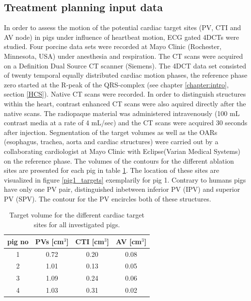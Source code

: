 \subsection{Treatment planning input data}
In order to assess the motion of the potential cardiac target sites (PV, CTI and AV node) in pigs under influence of heartbeat motion, 
ECG gated 4DCTs were studied. Four porcine data sets were recorded at Mayo Clinic (Rochester, Minnesota, USA) under anesthesia and respiration.  
The CT scans were acquired on a Definition Dual Source CT scanner (Siemens). The 4DCT data set consisted of twenty temporal equally distributed 
cardiac motion phases, the reference phase zero started at the R-peak of the QRS-complex (see chapter \ref{chapter:intro}, section \ref{HCS}). 
Native CT scans were recorded. In order to distinguish structures within the heart, contrast enhanced CT scans were also aquired directly 
after the native scans. The radiopaque material was administered intravenously (100 mL contrast media at a rate of 4 mL/sec) and the CT scans 
were acquired 30 seconds after injection.
Segmentation of the target volumes as well as the OARs (esophagus, trachea, aorta and cardiac structures) were carried out by a collaborating 
cardiologist at Mayo Clinic with Eclipse\texttrademark (Varian Medical Systems) on the reference phase. The volumes of the contours for the 
different ablation sites are presented for each pig in table \ref{tab:volume:mayo:porcine}. The location of these sites are visualized in 
figure \ref{pig1_targets} exemplarily for pig 1. Contrary to humans pigs have only one PV pair, distinguished inbetween inferior PV (IPV) and 
superior PV (SPV). The contour for the PV encircles both of these structures. 


\begin{table}[htbp]
  \centering
  \caption{Target volume for the different cardiac target sites for all investigated pigs.}
  \begin{tabular}{|c|c|c|c|}
    \hline\hline
    pig no\rule{0pt}{2.6ex}\rule[-1.2ex]{0pt}{0pt} & PVs [cm$^{3}$] & CTI [cm$^{3}$] & AV [cm$^{3}$]\\
    \hline
    1 & 0.72 & 0.20 & 0.08 \\
    2 & 1.01 & 0.13 & 0.05 \\
    3 & 1.09 & 0.24 & 0.06 \\
    4 & 1.03 & 0.31 & 0.02 \\
    \hline\hline
  \end{tabular}
  \label{tab:volume:mayo:porcine}
\end{table}

